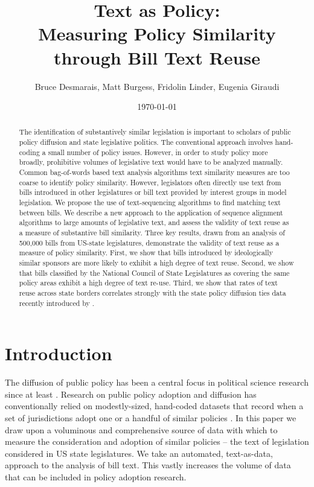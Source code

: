 \documentclass[12pt]{article} %
\begin{document}
 

\title{Text as Policy: \\ Measuring Policy Similarity through Bill Text Reuse}
\date{\today}
\author{Bruce Desmarais, Matt Burgess, Fridolin Linder, Eugenia Giraudi}

\maketitle

\singlespacing
\begin{abstract} 
    \noindent The identification of substantively similar legislation is important to scholars of public policy diffusion and state legislative politics. The conventional approach involves hand-coding a small number of policy issues. However, in order to study policy more broadly, prohibitive volumes of legislative text would have to be analyzed manually. Common bag-of-words based text analysis algorithms text similarity measures are too coarse to identify policy similarity. However, legislators often directly use text from bills introduced in other legislatures or bill text provided by interest groups in model legislation. We propose the use of text-sequencing algorithms to find matching text between bills. We describe a new approach to the application of sequence alignment algorithms to large amounts of legislative text, and assess the validity of text reuse as a measure of substantive bill similarity. Three key results, drawn from an analysis of 500,000 bills from US-state legislatures, demonstrate the validity of text reuse as a measure of policy similarity. First, we show that bills introduced by ideologically similar sponsors are more likely to exhibit a high degree of text reuse. Second, we show that bills classified by the National Council of State Legislatures as covering the same policy areas exhibit a high degree of text re-use. Third, we show that rates of text reuse across state borders correlates strongly with the state policy diffusion ties data recently introduced by \citet{desmarais2015}.
\end{abstract}
\doublespacing
\clearpage

\section{Introduction} The diffusion of public policy has been a central focus in political science research since at least \citet{walker1969}. Research on public policy adoption and diffusion has conventionally relied on modestly-sized, hand-coded datasets that record when a set of jurisdictions adopt one or a handful of similar policies \citep{boehmke2012}. In this paper we draw upon a voluminous and comprehensive source of data with which to measure the consideration and adoption of similar policies -- the text of legislation considered in US state legislatures. We take an automated, text-as-data, approach to the analysis of bill text. This vastly increases the volume of data that can be included in policy adoption research. 
\end{document}
